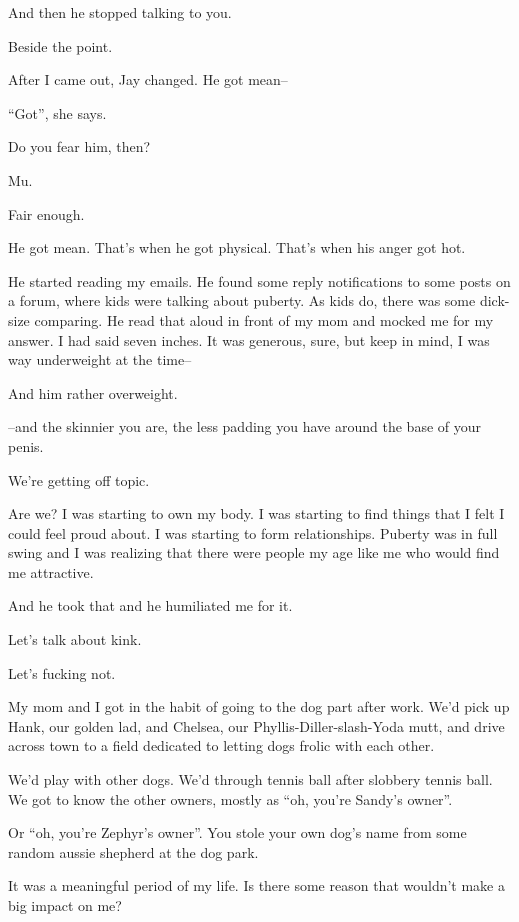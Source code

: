 \begin{ally}
And then he stopped talking to you.
\end{ally}
Beside the point.

After I came out, Jay changed. He got mean--

\begin{ally}
``Got'', she says.
\end{ally}
Do you fear him, then?

\begin{ally}
Mu.
\end{ally}
Fair enough.

He got mean. That's when he got physical. That's when his anger got hot.

He started reading my emails. He found some reply notifications to some posts on a forum, where kids were talking about puberty. As kids do, there was some dick-size comparing. He read that aloud in front of my mom and mocked me for my answer. I had said seven inches. It was generous, sure, but keep in mind, I was way underweight at the time--

\begin{ally}
And him rather overweight.
\end{ally}
--and the skinnier you are, the less padding you have around the base of your penis.

\begin{ally}
We're getting off topic.
\end{ally}
Are we? I was starting to own my body. I was starting to find things that I felt I could feel proud about. I was starting to form relationships. Puberty was in full swing and I was realizing that there were people my age like me who would find me attractive.

And he took that and he humiliated me for it.

\begin{ally}
Let's talk about kink.
\end{ally}
Let's fucking not.
\newpage

My mom and I got in the habit of going to the dog part after work. We'd pick up Hank, our golden lad, and Chelsea, our Phyllis-Diller-slash-Yoda mutt, and drive across town to a field dedicated to letting dogs frolic with each other.

We'd play with other dogs. We'd through tennis ball after slobbery tennis ball. We got to know the other owners, mostly as ``oh, you're Sandy's owner''.

\begin{ally}
Or ``oh, you're Zephyr's owner''. You stole your own dog's name from some random aussie shepherd at the dog park.
\end{ally}
It was a meaningful period of my life. Is there some reason that wouldn't make a big impact on me?

